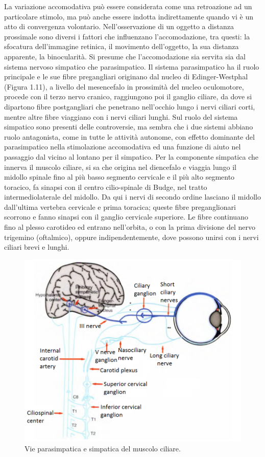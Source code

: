 La variazione accomodativa può essere considerata come una retroazione ad un particolare stimolo, ma può anche essere indotta indirettamente quando vi è un atto di convergenza volontario. Nell’osservazione di un oggetto a distanza prossimale sono diversi i fattori che influenzano l’accomodazione, tra questi: la sfocatura dell’immagine retinica, il movimento dell’oggetto, la sua distanza apparente, la binocularità. Si presume che l’accomodazione sia servita sia dal sistema nervoso simpatico che parasimpatico. Il sistema parasimpatico ha il ruolo principale e le sue fibre pregangliari originano dal nucleo di Edinger-Westphal (Figura 1.11), a livello del mesencefalo in prossimità del nucleo oculomotore, procede con il terzo nervo cranico, raggiungono poi il ganglio ciliare, da dove si dipartono fibre postgangliari che penetrano nell’occhio lungo i nervi ciliari corti, mentre altre fibre viaggiano con i nervi ciliari lunghi. Sul ruolo del sistema simpatico sono presenti delle controversie, ma sembra che i due sistemi abbiano ruolo antagonista, come in tutte le attività autonome, con effetto dominante del parasimpatico nella stimolazione accomodativa ed una funzione di aiuto nel passaggio dal vicino al lontano per il simpatico. Per la componente simpatica che innerva il muscolo ciliare, si sa che origina nel diencefalo e viaggia lungo il midollo spinale fino al più basso segmento cervicale e il più alto segmento toracico, fa sinapsi con il centro cilio-spinale di Budge, nel tratto intermediolaterale del midollo. Da qui i nervi di secondo ordine lasciano il midollo dall’ultima vertebra cervicale e prima toracica; queste fibre preganglionari scorrono e fanno sinapsi con il ganglio cervicale superiore. Le fibre continuano fino al plesso carotideo ed entrano nell’orbita, o con la prima divisione del nervo trigemino (oftalmico), oppure indipendentemente, dove possono unirsi con i nervi ciliari brevi e lunghi.

\begin{figure}[h!]
	\centering
	\includegraphics[scale=0.70]{source/immagini/accomodazione.png}
	\caption[Vie parasimpatica e simpatica del muscolo ciliare]{Vie parasimpatica e simpatica del muscolo ciliare.}
	\label{fig:test12}
\end{figure}

